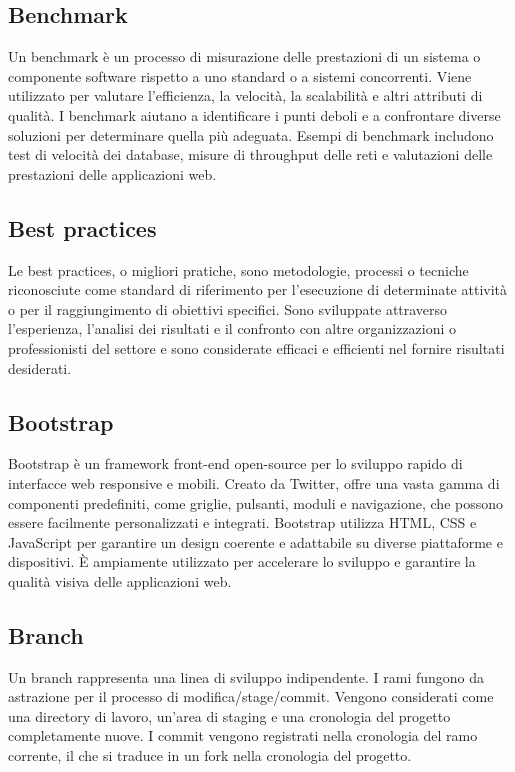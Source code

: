 \vspace{2em}
\subsection*{Benchmark}
\par Un benchmark è un processo di misurazione delle prestazioni di un sistema o componente software rispetto a uno standard o a sistemi concorrenti. Viene utilizzato per valutare l'efficienza, la velocità, la scalabilità e altri attributi di qualità. I benchmark aiutano a identificare i punti deboli e a confrontare diverse soluzioni per determinare quella più adeguata. Esempi di benchmark includono test di velocità dei database, misure di throughput delle reti e valutazioni delle prestazioni delle applicazioni web.

\vspace{2em}
\subsection*{Best practices}
\par Le best practices, o migliori pratiche, sono metodologie, processi o tecniche riconosciute come standard di riferimento per l'esecuzione di determinate attività o per il raggiungimento di obiettivi specifici. Sono sviluppate attraverso l'esperienza, l'analisi dei risultati e il confronto con altre organizzazioni o professionisti del settore e sono considerate efficaci e efficienti nel fornire risultati desiderati.

\vspace{2em}
\subsection*{Bootstrap}
\par Bootstrap è un framework front-end open-source per lo sviluppo rapido di interfacce web responsive e mobili. Creato da Twitter, offre una vasta gamma di componenti predefiniti, come griglie, pulsanti, moduli e navigazione, che possono essere facilmente personalizzati e integrati. Bootstrap utilizza HTML, CSS e JavaScript per garantire un design coerente e adattabile su diverse piattaforme e dispositivi. È ampiamente utilizzato per accelerare lo sviluppo e garantire la qualità visiva delle applicazioni web.

\vspace{2em}
\subsection*{Branch}
\par Un branch rappresenta una linea di sviluppo indipendente. I rami fungono da astrazione per il processo di modifica/stage/commit. Vengono considerati come una directory di lavoro, un'area di staging e una cronologia del progetto completamente nuove. I commit vengono registrati nella cronologia del ramo corrente, il che si traduce in un fork nella cronologia del progetto.

